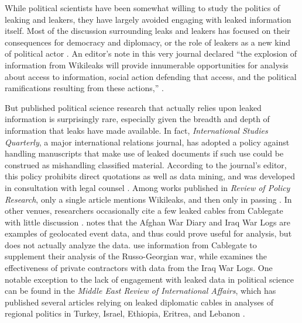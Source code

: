 \documentclass[12pt]{article}
\begin{document}
While political scientists have been somewhat willing to study the politics of leaking and leakers, 
they have largely avoided engaging with leaked information itself.
Most of the discussion surrounding leaks and leakers has focused on 
their consequences for democracy and diplomacy, or the role of 
leakers as a new kind of political actor \citep{simmons2011international,
davis2012political,pieterse2012leaking,springer2012leaky,
wong2013e-bandits}. An editor's note in this very journal declared ``the explosion of information 
from Wikileaks will provide innumerable opportunities for analysis about access to information, social action 
defending that access, and the political ramifications resulting from these actions,'' \citep[123]{gore2011editors}.

But published political science research that actually relies upon leaked information is surprisingly rare, especially given the breadth and depth of information that leaks have made 
available. 
In fact, \emph{International Studies Quarterly}, a major international relations journal, 
has adopted a policy against handling manuscripts that make use of leaked documents if such use 
could be construed as mishandling classified material. According to the journal's editor, 
this policy prohibits direct quotations as well as data mining, and was developed in consultation with legal 
counsel \citep{isq_editors2014personal}.
Among works published in \textit{Review of Policy Research}, only a single article mentions Wikileaks, and then only in passing \citep{kingiri2012role}.
In other venues, researchers occasionally cite a few leaked cables from 
Cablegate with little discussion \citep{bowen2011irans,guliyev2012political}.
\citet{schrodt2012precedents} notes that the Afghan War Diary and Iraq War Logs are examples of 
geolocated event data, and thus could prove useful for analysis, but does not actually analyze the 
data.
\citet{mouritzen2012explaining} use information from Cablegate to supplement their analysis of the 
Russo-Georgian war, while
\citet{petersohn2013effectiveness} examines the effectiveness of private contractors with data from the 
Iraq War Logs. 
One notable exception to the lack of engagement with leaked data in political science 
can be found in the \emph{Middle East Review of International Affairs}, which has published several 
articles relying on leaked diplomatic cables in analyses of regional politics in Turkey, Israel, 
Ethiopia, Eritrea, and Lebanon \citep{altiparmak2011wikileaks,
spyer2011israel,lefebvre2012choosing,smyth2011``independent}.
\end{document}
